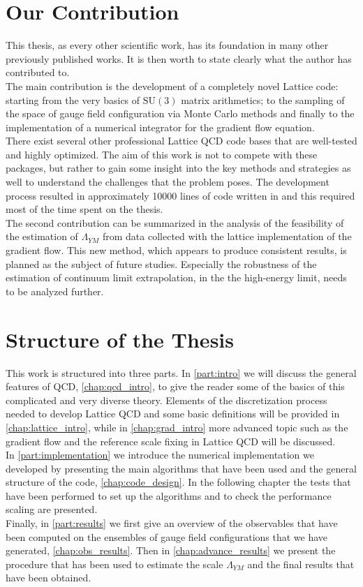 \section{Our Contribution}
This thesis, as every other scientific work, has its foundation in many other previously published works. It is then worth to state clearly what the author has contributed to. \\
The main contribution is the development of a completely novel Lattice code: starting from the very basics of $\mathrm{SU}(3)$ matrix arithmetics; to the sampling of the space of gauge field configuration via Monte Carlo methods and finally to the implementation of a numerical integrator for the gradient flow equation. \\
There exist several other professional Lattice QCD code bases that are well-tested and highly optimized. The aim of this work is not to compete with these packages, but rather to gain some insight into the key methods and strategies as well to understand the challenges that the problem poses. The development process resulted in approximately 10000 lines of code written in \cpp and this required most of the time spent on the thesis.\\
The second contribution can be summarized in the analysis of the feasibility of the estimation of $\Lambda_{YM}$ from data collected with the lattice implementation of the gradient flow. This new method, which appears to produce consistent results, is planned as the subject of future studies. Especially the robustness of the estimation of continuum limit extrapolation, in the the high-energy limit, needs to be analyzed further.  


\section{Structure of the Thesis}
This work is structured into three parts. In \cref{part:intro} we will discuss the general features of QCD, \cref{chap:qcd_intro}, to give the reader some of the basics of this complicated and very diverse theory. Elements of the discretization process needed to develop Lattice QCD and some basic definitions will be provided in \cref{chap:lattice_intro}, while in \cref{chap:grad_intro} more advanced topic such as the gradient flow and the reference scale fixing in Lattice QCD will be discussed.  \\
In \cref{part:implementation} we introduce the numerical implementation we developed by presenting the main algorithms that have been used and the general structure of the code, \cref{chap:code_design}. In the following chapter the tests that have been performed to set up the algorithms and to check the performance scaling are presented.\\
Finally, in \cref{part:results} we first give an overview of the observables that have been computed on the ensembles of gauge field configurations that we have generated, \cref{chap:obs_results}. Then  in \cref{chap:advance_results} we present the procedure that has been used to estimate the scale $\Lambda_{YM}$ and the final results that have been obtained. 